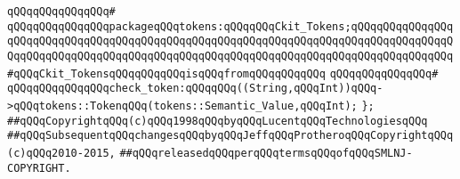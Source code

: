 \verb|qQQqqQQqqQQqqQQq#|\newline
\verb|qQQqqQQqqQQqqQQqpackageqQQqtokens:qQQqqQQqCkit_Tokens;qQQqqQQqqQQqqQQqqQQqqQQqqQQqqQQqqQQqqQQqqQQqqQQqqQQqqQQqqQQqqQQqqQQqqQQqqQQqqQQqqQQqqQQqqQQqqQQqqQQqqQQqqQQqqQQqqQQqqQQqqQQqqQQqqQQqqQQqqQQqqQQqqQQqqQQqqQQq#qQQqCkit_TokensqQQqqQQqqQQqisqQQqfromqQQqqQQqqQQq|\newline
\verb|qQQqqQQqqQQqqQQq#|\newline
\verb|qQQqqQQqqQQqqQQqcheck_token:qQQqqQQq((String,qQQqInt))qQQq->qQQqtokens::TokenqQQq(tokens::Semantic_Value,qQQqInt);|\newline
\verb|};|\newline
\newline
\verb|##qQQqCopyrightqQQq(c)qQQq1998qQQqbyqQQqLucentqQQqTechnologiesqQQq|\newline
\verb|##qQQqSubsequentqQQqchangesqQQqbyqQQqJeffqQQqProtheroqQQqCopyrightqQQq(c)qQQq2010-2015,|\newline
\verb|##qQQqreleasedqQQqperqQQqtermsqQQqofqQQqSMLNJ-COPYRIGHT.|\newline

